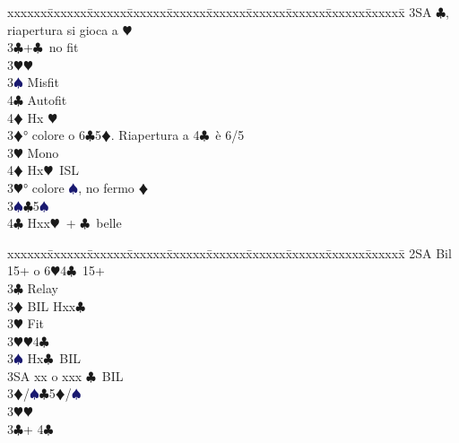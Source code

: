 \documentclass[a4paper,italian]{article}
\newcommand{\BC}{\textcolor{OliveGreen}{$\clubsuit$}}
\newcommand{\BD}{\textcolor{RedOrange}{$\vardiamondsuit$}}
\newcommand{\BH}{\textcolor{Red2}{$\varheartsuit${}}}
\newcommand{\BS}{\textcolor{MidnightBlue}{$\spadesuit${}}}
\newenvironment{bidtable}
{\begin{tabbing}

    xxxxxx\=xxxxxx\=xxxxxx\=xxxxxx\=xxxxxx\=xxxxxx\=xxxxxx\=xxxxxx\=xxxxxx\=xxxxxx\=\kill}
{\end{tabbing} }%
\begin{document}
\begin{multicols}{2}
\begin{bidtable}
                                            3SA \BC , riapertura si gioca a \BH \-\\
                                            3\BC {}+\BC\ no fit\+\\
                                            3\BH {}\BH \+\\
                                            3\BS \> Misfit\\
                                            4\BC \> Autofit\\
                                            4\BD \> Hx \BH \-\-\\
                                            3\BD {}° colore o 6\BC 5\BD . Riapertura a 4\BC\ è 6/5\+\\
                                            3\BH \> Mono\+\\
                                            4\BD \> Hx\BH\ ISL\-\-\\
                                            3\BH {}° colore \BS, no fermo \BD\\
                                            3\BS {}\BC 5\BS \\
                                            4\BC \> Hxx\BH\ + \BC\ belle\-\\
                                        \end{bidtable}
                                        \columnbreak
                                        \begin{bidtable}
                                            2SA \> Bil 15+ o 6\BH 4\BC\ 15+\+\\
                                            3\BC \> Relay\+\\
                                            3\BD \> BIL Hxx\BC \+\\
                                            3\BH \> Fit\-\\
                                            3\BH {}\BH 4\BC \\
                                            3\BS \> Hx\BC\ BIL\\
                                            3SA \> xx o xxx \BC\ BIL\-\\
                                            3\BD/\BS {}\BC 5\BD /\BS \\
                                            3\BH {}\BH \-\\
                                            3\BC {}+ 4\BC \+\\

\end{bidtable}
\end{multicols}
\end{document}
